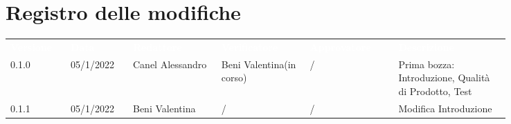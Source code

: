 \section*{Registro delle modifiche}

{\renewcommand{\arraystretch}{1.5}
\scriptsize
\begin{tabular}{p{0.10\linewidth}p{0.10\linewidth}p{0.15\linewidth}p{0.15\linewidth}p{0.15\linewidth}p{0.19\linewidth}}
	\rowcolor[RGB]{33, 73, 50}
	\textcolor{white}{\textbf{Versione}} & \textcolor{white}{\textbf{Data}} &
	\textcolor{white}{\textbf{Redattore}} & \textcolor{white}{\textbf{Verificatore}} &
	\textcolor{white}{\textbf{Approvatore}} & \textcolor{white}{\textbf{Descrizione}}\\
	\rowcolor[RGB]{216, 235, 171}
	0.1.0 & 05/1/2022 & Canel Alessandro& Beni Valentina(in corso) &/& Prima bozza: Introduzione, Qualità di Prodotto, Test\\
	\rowcolor[RGB]{233, 245, 206}
	0.1.1 & 05/1/2022 & Beni Valentina& / &/& Modifica Introduzione\\
\end{tabular}
}

